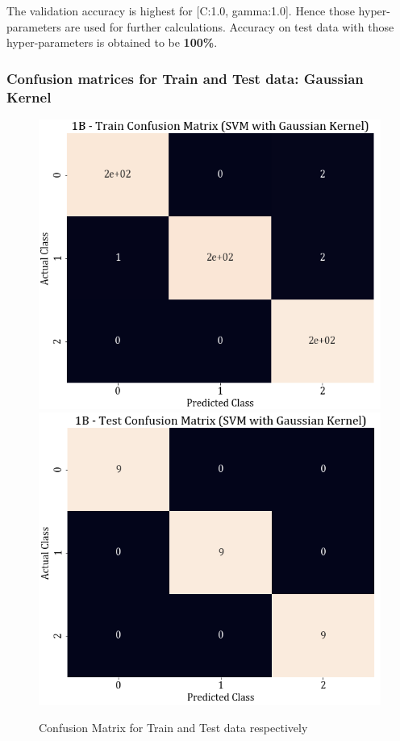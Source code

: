 \documentclass[11pt,a4paper]{article}
\begin{document}
The validation accuracy is highest for [C:1.0, gamma:1.0]. Hence those hyper-parameters are used for further calculations. Accuracy on test data with those hyper-parameters is obtained to be \textbf{100\%}. 

\subsubsection{Confusion matrices for Train and Test data: Gaussian Kernel}

\begin{figure}[H]
    \centering
    \includegraphics[scale=0.4]{images/1B_SVM_gauss_train_confmat.png}
    \includegraphics[scale=0.4]{images/1B_SVM_gauss_Test_confmat.png}
    \caption{Confusion Matrix for Train and Test data respectively}
\end{figure}
\end{document}
